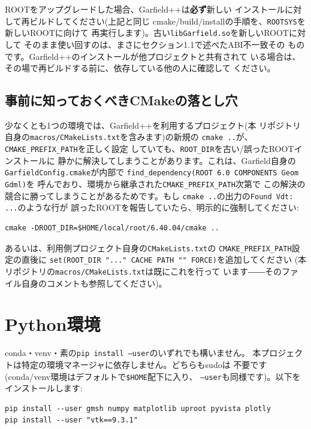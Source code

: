 \documentclass[11pt]{ltjsarticle}
\begin{document}
ROOTをアップグレードした場合、Garfield++は\textbf{必ず}新しい
インストールに対して再ビルドしてください(上記と同じ
cmake/build/installの手順を、\texttt{ROOTSYS}を新しいROOTに向けて
再実行します)。古い\texttt{libGarfield.so}を新しいROOTに対して
そのまま使い回すのは、まさにセクション1.1で述べたABI不一致その
ものです。Garfield++のインストールが他プロジェクトと共有されて
いる場合は、その場で再ビルドする前に、依存している他の人に確認して
ください。

\subsection{事前に知っておくべきCMakeの落とし穴}

少なくとも1つの環境では、Garfield++を利用するプロジェクト(本
リポジトリ自身の\texttt{macros/CMakeLists.txt}を含みます)の新規の
\texttt{cmake ..}が、\texttt{CMAKE\_PREFIX\_PATH}を正しく設定
していても、\texttt{ROOT\_DIR}を古い/誤ったROOTインストールに
静かに解決してしまうことがあります。これは、Garfield自身の
\texttt{GarfieldConfig.cmake}が内部で
\texttt{find\_dependency(ROOT 6.0 COMPONENTS Geom Gdml)}を
呼んでおり、環境から継承された\texttt{CMAKE\_PREFIX\_PATH}次第で
この解決の競合に勝ってしまうことがあるためです。もし
\texttt{cmake ..}の出力の\texttt{Found Vdt: ...}のような行が
誤ったROOTを報告していたら、明示的に強制してください:
\begin{lstlisting}
cmake -DROOT_DIR=$HOME/local/root/6.40.04/cmake ..
\end{lstlisting}
あるいは、利用側プロジェクト自身の\texttt{CMakeLists.txt}の
\texttt{CMAKE\_PREFIX\_PATH}設定の直後に
\texttt{set(ROOT\_DIR "..." CACHE PATH "" FORCE)}を追加してください
(本リポジトリの\texttt{macros/CMakeLists.txt}は既にこれを行って
います――そのファイル自身のコメントも参照してください)。

\section{Python環境}
\label{sec:python}

conda・venv・素の\texttt{pip install --user}のいずれでも構いません。
本プロジェクトは特定の環境マネージャに依存しません。どちらもsudoは
不要です(conda/venv環境はデフォルトで\texttt{\$HOME}配下に入り、
\texttt{--user}も同様です)。以下をインストールします:

\begin{lstlisting}
pip install --user gmsh numpy matplotlib uproot pyvista plotly
pip install --user "vtk==9.3.1"
\end{lstlisting}
\end{document}
